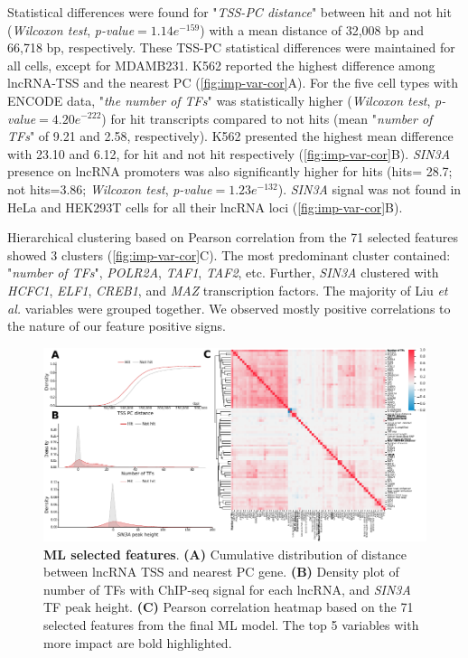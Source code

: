 Statistical differences were found for "\textit{TSS-PC distance}" between hit and not hit (\textit{Wilcoxon test}, \textit{p-value}$= 1.14e^{-159}$) with a mean distance of 32,008 bp and 66,718 bp, respectively. These TSS-PC statistical differences were maintained for all cells, except for MDAMB231. K562 reported the highest difference among lncRNA-TSS and the nearest PC (\autoref{fig:imp-var-cor}A). For the five cell types with ENCODE data, "\textit{the number of TFs}" was statistically higher (\textit{Wilcoxon test}, \textit{p-value}$= 4.20e^{-222}$) for hit transcripts compared to not hits (mean "\textit{number of TFs}" of 9.21 and 2.58, respectively). K562 presented the highest mean difference with 23.10 and 6.12, for hit and not hit respectively (\autoref{fig:imp-var-cor}B). \textit{SIN3A} presence on lncRNA promoters was also significantly higher for hits (hits= 28.7; not hits=3.86; \textit{Wilcoxon test}, \textit{p-value}$= 1.23e^{-132}$). \textit{SIN3A} signal was not found in HeLa and HEK293T cells for all their lncRNA loci (\autoref{fig:imp-var-cor}B).

Hierarchical clustering based on Pearson correlation from the 71 selected features showed 3 clusters (\autoref{fig:imp-var-cor}C). The most predominant cluster contained: "\textit{number of TFs}", \textit{POLR2A}, \textit{TAF1}, \textit{TAF2}, etc. Further, \textit{SIN3A} clustered with \textit{HCFC1}, \textit{ELF1}, \textit{CREB1}, and \textit{MAZ} transcription factors. The majority of Liu \textit{et al.}\autocite{liu_2017_crispri} variables were grouped together. We observed mostly positive correlations to the nature of our feature positive signs. 

\begin{figure}[ht!]
  \centering
  \includegraphics[scale=0.83]{plots/results/ml/shap.feat.importance.var.cor.heatmap.v2.pdf}
  \caption[ML selected features]{\textbf{ML selected features}. \textbf{(A)} Cumulative distribution of distance between lncRNA TSS and nearest PC gene. \textbf{(B)} Density plot of number of TFs with ChIP-seq signal for each lncRNA, and \textit{SIN3A} TF peak height. \textbf{(C)} Pearson correlation heatmap based on the 71 selected features from the final ML model. The top 5 variables with more impact are bold highlighted. }
  \label{fig:imp-var-cor}
\end{figure}

